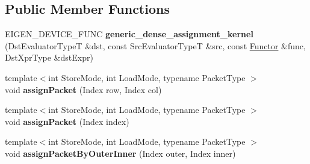 \subsection*{Public Member Functions}
\begin{DoxyCompactItemize}
\item 
\mbox{\label{class_eigen_1_1internal_1_1generic__dense__assignment__kernel_3_01_dst_evaluator_type_t_00_01_sr759181e846694beea0b332c7e3bbe519_af021f159ee0bc803910bbb66b4cb6b30}} 
E\+I\+G\+E\+N\+\_\+\+D\+E\+V\+I\+C\+E\+\_\+\+F\+U\+NC {\bfseries generic\+\_\+dense\+\_\+assignment\+\_\+kernel} (Dst\+Evaluator\+TypeT \&dst, const Src\+Evaluator\+TypeT \&src, const \mbox{\hyperlink{struct_eigen_1_1internal_1_1swap__assign__op}{Functor}} \&func, Dst\+Xpr\+Type \&dst\+Expr)
\item 
\mbox{\label{class_eigen_1_1internal_1_1generic__dense__assignment__kernel_3_01_dst_evaluator_type_t_00_01_sr759181e846694beea0b332c7e3bbe519_a809f097a9d6aaf4fc163ddab88b06911}} 
{\footnotesize template$<$int Store\+Mode, int Load\+Mode, typename Packet\+Type $>$ }\\void {\bfseries assign\+Packet} (Index row, Index col)
\item 
\mbox{\label{class_eigen_1_1internal_1_1generic__dense__assignment__kernel_3_01_dst_evaluator_type_t_00_01_sr759181e846694beea0b332c7e3bbe519_a4e8ebdacba61e8f158f07f14a76e8270}} 
{\footnotesize template$<$int Store\+Mode, int Load\+Mode, typename Packet\+Type $>$ }\\void {\bfseries assign\+Packet} (Index index)
\item 
\mbox{\label{class_eigen_1_1internal_1_1generic__dense__assignment__kernel_3_01_dst_evaluator_type_t_00_01_sr759181e846694beea0b332c7e3bbe519_ae7ba45c9ab25266bfada7020ee64333f}} 
{\footnotesize template$<$int Store\+Mode, int Load\+Mode, typename Packet\+Type $>$ }\\void {\bfseries assign\+Packet\+By\+Outer\+Inner} (Index outer, Index inner)
\end{DoxyCompactItemize}
